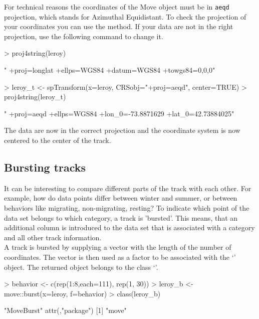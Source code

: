 \documentclass[article,nojss]{jss}
\newcommand{\fct}[1]{{\code{#1()}}}
\newcommand{\class}[1]{{`\code{#1}'}}
\begin{document}
For technical reasons the coordinates of the Move object must be in \texttt{aeqd} projection, which stands for Azimuthal Equidistant. To check the projection of your coordinates you can use the \fct{proj4string} method. If your data are not in the right projection, use the following command to change it. 

\begin{Schunk}
\begin{Sinput}
> proj4string(leroy)
\end{Sinput}
\begin{Soutput}
[1] " +proj=longlat +ellps=WGS84 +datum=WGS84 +towgs84=0,0,0"
\end{Soutput}
\begin{Sinput}
> leroy_t <- spTransform(x=leroy, CRSobj="+proj=aeqd", center=TRUE)  
> proj4string(leroy_t)
\end{Sinput}
\begin{Soutput}
[1] " +proj=aeqd +ellps=WGS84 +lon_0=-73.8871629 +lat_0=42.73884025"
\end{Soutput}
\end{Schunk}

The data are now in the correct projection and the coordinate system is now centered to the center of the track. 


\subsection{Bursting tracks}
It can be interesting to compare different parts of the track with each other. For example, how do data points differ between winter and summer, or between behaviors like migrating, non-migrating, resting? To indicate which point of the data set belongs to which category, a track is 'bursted'. This means, that an additional column is introduced to the data set that is associated with a category and all other track information. \\
A track is bursted by supplying a vector with the length of the number of coordinates. The vector is then used as a factor to be associated with the \class{Move} object. The returned object belongs to the class \class{MoveBurst}. 

\begin{Schunk}
\begin{Sinput}
> behavior <- c(rep(1:8,each=111), rep(1, 30))
> leroy_b <- move::burst(x=leroy, f=behavior)
> class(leroy_b)
\end{Sinput}
\begin{Soutput}
[1] "MoveBurst"
attr(,"package")
[1] "move"
\end{Soutput}
\end{Schunk}
\end{document}
